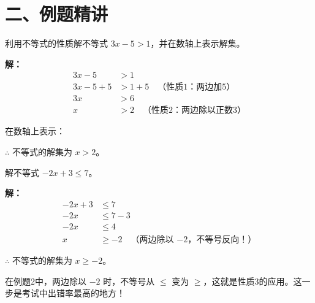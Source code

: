 \documentclass[12pt, a4paper]{ctexart}
\begin{document}
\section*{\textcolor{examorange}{二、例题精讲}}

\begin{examplebox}[【例题1】利用不等式性质解简单不等式]
利用不等式的性质解不等式 $3x - 5 > 1$，并在数轴上表示解集。

\textbf{解：}
\begin{align*}
3x - 5 &> 1 \\
3x - 5 + 5 &> 1 + 5 \quad \text{（性质1：两边加5）} \\
3x &> 6 \\
x &> 2 \quad \text{（性质2：两边除以正数3）}
\end{align*}

在数轴上表示：

\begin{center}
\end{center}

$\therefore$ 不等式的解集为 $x > 2$。
\end{examplebox}

\begin{examplebox}
解不等式 $-2x + 3 \leqslant 7$。

\textbf{解：}
\begin{align*}
-2x + 3 &\leqslant 7 \\
-2x &\leqslant 7 - 3 \\
-2x &\leqslant 4 \\
x &\geqslant -2 \quad \text{（两边除以 $-2$，不等号反向！）}
\end{align*}

$\therefore$ 不等式的解集为 $x \geqslant -2$。
\end{examplebox}

\begin{warnbox}[关键提醒]
在例题2中，两边除以 $-2$ 时，不等号从 $\leqslant$ 变为 $\geqslant$，这就是性质3的应用。这一步是考试中出错率最高的地方！
\end{warnbox}
\end{document}
